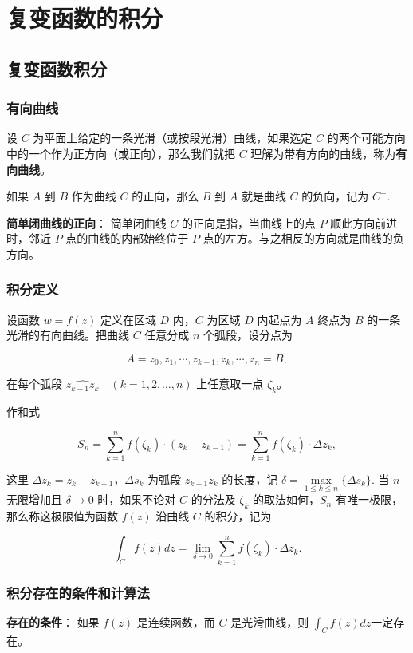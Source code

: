 \section{复变函数的积分}
\label{复变函数的积分}
\subsection{复变函数积分}
\label{复变函数积分}
\subsubsection{有向曲线}
\label{有向曲线}
设 \(C\) 为平面上给定的一条光滑（或按段光滑）曲线，如果选定 \(C\)
的两个可能方向中的一个作为正方向（或正向），那么我们就把 \(C\)
理解为带有方向的曲线，称为\textbf{有向曲线}。

如果 \(A\) 到 \(B\) 作为曲线 \(C\) 的正向，那么 \(B\) 到 \(A\) 就是曲线
\(C\) 的负向，记为 \(C^{-}\).

\textbf{简单闭曲线的正向}： 简单闭曲线 \(C\) 的正向是指，当曲线上的点 \(P\)
顺此方向前进时，邻近 \(P\) 点的曲线的内部始终位于 \(P\)
点的左方。与之相反的方向就是曲线的负方向。
\subsubsection{积分定义}
\label{积分定义}
设函数 \(w = f(z)\) 定义在区域 \(D\) 内，\(C\) 为区域 \(D\) 内起点为
\(A\) 终点为 \(B\) 的一条光滑的有向曲线。把曲线 \(C\) 任意分成 \(n\)
个弧段，设分点为

\[
A = z_0, z_1, \cdots, z_{k-1}, z_k, \cdots, z_n = B,
\]

在每个弧段 \(\widehat{z_{k-1}z_k}\quad (k = 1, 2, \dots, n )\)
上任意取一点 \(\zeta_k\)。

作和式

\[
S_{n} = \sum_{k=1}^{n} f(\zeta_{k}) \cdot (z_{k} - z_{k-1}) = \sum_{k=1}^{n} f(\zeta_{k}) \cdot \Delta z_{k},
\]

这里 \(\Delta z_{k} = z_{k} - z_{k-1}\)，\(\Delta s_{k}\) 为弧段
\(z_{k-1}z_{k}\) 的长度，记
\(\delta = \max\limits_{1 \leq k \leq n} \{\Delta s_{k}\}\). 当 \(n\)
无限增加且 \(\delta \to 0\) 时，如果不论对 \(C\) 的分法及 \(\zeta_{k}\)
的取法如何，\(S_{n}\) 有唯一极限，那么称这极限值为函数 \(f(z)\) 沿曲线
\(C\) 的积分，记为

\[
\int_{C} f(z)dz=\lim_{\delta \to 0}\sum^n_{k=1}f(\zeta_k)\cdot \Delta z_k.
\]
\subsubsection{积分存在的条件和计算法}
\label{积分存在的条件和计算法}
\textbf{存在的条件}： 如果 \(f(z)\) 是连续函数，而 \(C\) 是光滑曲线，则
\(\int_C f(z)dz\)一定存在。

